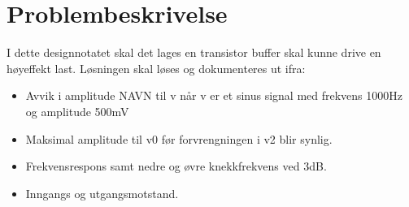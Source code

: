 \section{Problembeskrivelse}
\label{problemBeskrivelse}


I dette designnotatet skal det lages en transistor buffer skal kunne drive en høyeffekt last. Løsningen skal løses og dokumenteres ut ifra:
\begin{itemize}
\item Avvik i amplitude NAVN til v når v er et sinus signal med frekvens 1000Hz og amplitude 500mV
\item Maksimal amplitude til v0  før forvrengningen i v2 blir synlig.
\item Frekvensrespons samt nedre og øvre knekkfrekvens ved 3dB.
\item Inngangs og utgangsmotstand.
\end{itemize}

